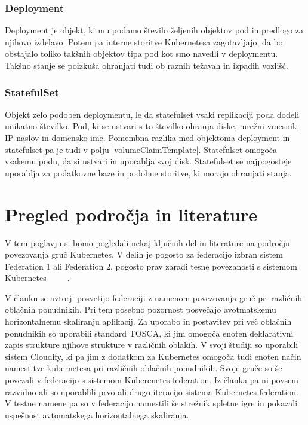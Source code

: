 \documentclass[a4paper, 12pt]{book}
\begin{document}
\subsection{Deployment~\cite{deployment}}
Deployment je objekt, ki mu podamo število željenih objektov pod in predlogo za njihovo izdelavo.
Potem pa interne storitve Kubernetesa zagotavljajo, da bo obstajalo toliko takšnih objektov tipa pod kot smo navedli v deploymentu.
Takšno stanje se poizkuša ohranjati tudi ob raznih težavah in izpadih vozlišč.
\subsection{StatefulSet~\cite{statefulset}}
Objekt zelo podoben deploymentu, le da statefulset vsaki replikaciji poda dodeli unikatno številko. 
Pod, ki se ustvari s to številko ohranja diske, mrežni vmesnik, IP naslov in domensko ime.
Pomembna razlika med objektoma deployment in statefulset pa je tudi v polju \spverb|volumeClaimTemplate|.
Statefulset omogoča vsakemu podu, da si ustvari in uporablja svoj disk.
Statefulset se najpogosteje uporablja za podatkovne baze in podobne storitve, ki morajo ohranjati stanja.
\chapter{Pregled področja in literature}
V tem poglavju si bomo pogledali nekaj ključnih del in literature na področju povezovanja gruč Kubernetes.
V delih je pogosto za federacijo izbran sistem Federation 1 ali Federation 2, pogosto prav zaradi tesne povezanosti s sistemom Kubernetes ~\cite{tosca-fed} ~\cite{dyn-place} ~\cite{kube-and-edge}.


V članku \cite{tosca-fed} se avtorji posvetijo federaciji z namenom povezovanja gruč pri različnih oblačnih ponudnikih.
Pri tem posebno pozornost posvečajo avotmatskemu horizontalnemu skaliranju aplikacij.
Za uporabo in postavitev pri več oblačnih ponudnikih so uporabili standard TOSCA, ki jim omogoča enoten deklarativni zapis strukture njihove strukture v različnih oblakih.
V svoji študiji so uporabili sistem Cloudify, ki pa jim z dodatkom za Kubernetes omogoča tudi enoten način namestitve kubernetesa pri različnih oblačnih ponudnikih.
Svoje gruče so še povezali v federacijo s sistemom Kuberenetes federation. 
Iz članka pa ni povsem razvidno ali so uporablili prvo ali drugo iteracijo sistema Kubernetes federation.
V testne namene pa so v federacijo namestili še strežnik spletne igre in pokazali uspešnost avtomatskega horizontalnega skaliranja.
\end{document}
